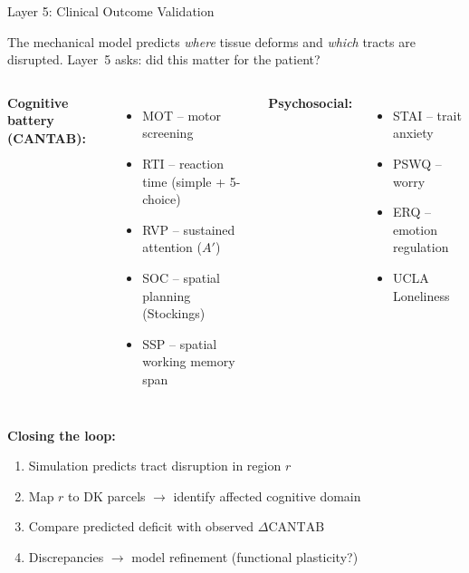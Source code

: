 \begin{frame}{Layer 5: Clinical Outcome Validation}

  The mechanical model predicts \emph{where} tissue deforms and
  \emph{which} tracts are disrupted. Layer~5 asks:
  \alert{did this matter for the patient?}

  \bigskip

  \begin{columns}[T]
    \textbf{Cognitive battery (CANTAB):}
    \begin{itemize}
      \item MOT -- motor screening
      \item RTI -- reaction time (simple + 5-choice)
      \item RVP -- sustained attention ($A'$)
      \item SOC -- spatial planning (Stockings)
      \item SSP -- spatial working memory span
    \end{itemize}

    \textbf{Psychosocial:}
    \begin{itemize}
      \item STAI -- trait anxiety
      \item PSWQ -- worry
      \item ERQ -- emotion regulation
      \item UCLA Loneliness
    \end{itemize}
  \end{columns}

  \bigskip

  \textbf{Closing the loop:}
  \begin{enumerate}
    \item Simulation predicts tract disruption in region $r$
    \item Map $r$ to DK parcels $\to$ identify affected cognitive domain
    \item Compare predicted deficit with observed $\Delta\text{CANTAB}$
    \item Discrepancies $\to$ model refinement (functional plasticity?)
  \end{enumerate}

\end{frame}

